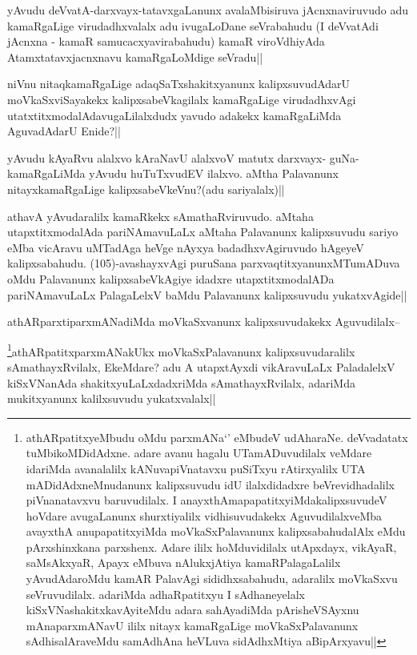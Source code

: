 
\begin{artha}
yAvudu deVvatA-darxvayx-tatavxgaLanunx avalaMbisiruva jAcnxnaviruvudo adu kamaRgaLige virudadhxvalalx adu ivugaLoDane seVrabahudu (I deVvatAdi jAcnxna - kamaR samucacxyavirabahudu) kamaR viroVdhiyAda Atamxtatavxjacnxnavu kamaRgaLoMdige seVradu||
\end{artha}

\begin{artha}
niVnu nitaqkamaRgaLige adaqSaTxshakitxyanunx kalipxsuvudAdarU moVkaSxviSayakekx kalipxsabeVkagilalx kamaRgaLige virudadhxvAgi utatxtitxmodalAdavugaLilalxdudx yavudo adakekx kamaRgaLiMda AguvadAdarU Enide?||
\end{artha}

\begin{artha}
yAvudu kAyaRvu alalxvo kAraNavU alalxvoV matutx darxvayx- guNa-kamaRgaLiMda yAvudu huTuTxvudEV ilalxvo. aMtha Palavanunx nitayxkamaRgaLige kalipxsabeVkeVnu?(adu sariyalalx)||
\end{artha}

\begin{artha}
athavA yAvudaralilx kamaRkekx sAmathaRviruvudo. aMtaha utapxtitxmodalAda pariNAmavuLaLx aMtaha Palavanunx kalipxsuvudu sariyo eMba vicAravu uMTadAga heVge nAyxya badadhxvAgiruvudo hAgeyeV kalipxsabahudu. (105)-avashayxvAgi puruSana parxvaqtitxyanunxMTumADuva oMdu Palavanunx kalipxsabeVkAgiye idadxre utapxtitxmodalADa pariNAmavuLaLx PalagaLelxV baMdu Palavanunx kalipxsuvudu yukatxvAgide||
\end{artha}

\begin{artha}
athARparxtiparxmANadiMda moVkaSxvanunx kalipxsuvudakekx Aguvudilalx--
\end{artha}

\begin{artha}
\footnote{athARpatitxyeMbudu oMdu parxmANa`\stext' eMbudeV udAharaNe. deVvadatatx tuMbikoMDidAdxne. adare avanu hagalu UTamADuvudilalx veMdare idariMda avanalalilx kANuvapiVnatavxu puSiTxyu rAtirxyalilx UTA mADidAdxneMnudanunx kalipxsuvudu idU ilalxdidadxre beVrevidhadalilx piVnanatavxvu baruvudilalx. I anayxthAmapapatitxyiMdakalipxsuvudeV hoVdare avugaLanunx shurxtiyalilx vidhisuvudakekx AguvudilalxveMba avayxthA anupapatitxyiMda moVkaSxPalavanunx kalipxsabahudalAlx eMdu pArxshinxkana parxshenx. Adare ililx hoMduvidilalx utApxdayx, vikAyaR, saMsAkxyaR, Apayx eMbuva nAlukxjAtiya kamaRPalagaLalilx yAvudAdaroMdu kamAR PalavAgi sididhxsabahudu, adaralilx moVkaSxvu seVruvudilalx. adariMda adhaRpatitxyu I sAdhaneyelalx kiSxVNashakitxkavAyiteMdu adara sahAyadiMda pArisheVSAyxnu mAnaparxmANavU ililx nitayx kamaRgaLige moVkaSxPalavanunx sAdhisalAraveMdu samAdhAna heVLuva sidAdhxMtiya aBipArxyavu||}athARpatitxparxmANakUkx moVkaSxPalavanunx kalipxsuvudaralilx sAmathayxRvilalx, EkeMdare? adu A utapxtAyxdi vikAravuLaLx PaladalelxV kiSxVNanAda shakitxyuLaLxdadxriMda sAmathayxRvilalx, adariMda mukitxyanunx kalilxsuvudu yukatxvalalx||
\end{artha}

